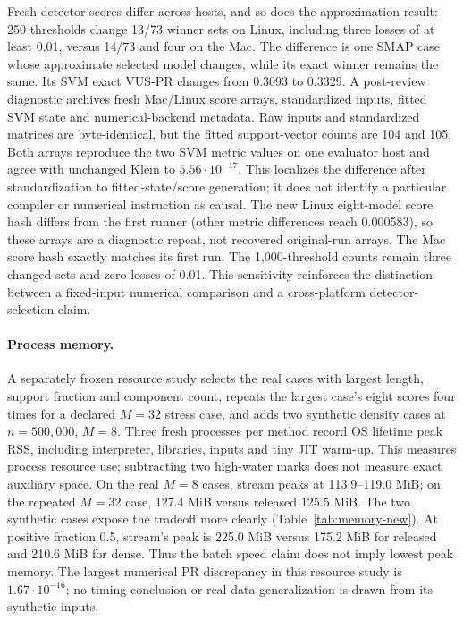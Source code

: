 Fresh detector scores differ across hosts, and so does the approximation result: 250 thresholds
change 13/73 winner sets on Linux, including three losses of at least 0.01,
versus 14/73 and four on the Mac. The difference is one SMAP case whose
approximate selected model changes, while its exact winner remains the same.
Its SVM exact VUS-PR changes from 0.3093 to 0.3329. A post-review diagnostic
archives fresh Mac/Linux score arrays, standardized inputs, fitted SVM state
and numerical-backend metadata. Raw inputs and standardized matrices are
byte-identical, but the fitted support-vector counts are 104 and 105. Both
arrays reproduce the two SVM metric values on one evaluator host and agree
with unchanged Klein to $5.56\cdot10^{-17}$. This localizes the difference
after standardization to fitted-state/score generation; it does not identify
a particular compiler or numerical instruction as causal. The new Linux
eight-model score hash differs from the first runner (other metric differences
reach 0.000583), so these arrays are a diagnostic repeat, not recovered
original-run arrays. The Mac score hash exactly matches its first run.
The 1,000-threshold counts remain three changed sets and zero losses of 0.01.
This sensitivity reinforces the distinction between a fixed-input numerical
comparison and a cross-platform detector-selection claim.

\paragraph{Process memory.}
A separately frozen resource study selects the real cases with largest length,
support fraction and component count, repeats the largest case's eight scores
four times for a declared $M=32$ stress case, and adds two synthetic density
cases at $n=500{,}000$, $M=8$. Three fresh processes per method record OS
lifetime peak RSS, including interpreter, libraries, inputs and tiny JIT warm-up.
This measures process resource use; subtracting two high-water marks does not
measure exact auxiliary space. On the real $M=8$ cases, stream peaks at
113.9--119.0 MiB; on the repeated $M=32$ case, 127.4 MiB versus released
125.5 MiB. The two synthetic cases expose the tradeoff more clearly
(Table~\ref{tab:memory-new}). At positive fraction 0.5, stream's peak is
225.0 MiB versus 175.2 MiB for released and 210.6 MiB for dense. Thus the
batch speed claim does not imply lowest peak memory. The largest numerical
PR discrepancy in this resource study is $1.67\cdot10^{-16}$; no timing
conclusion or real-data generalization is drawn from its synthetic inputs.

